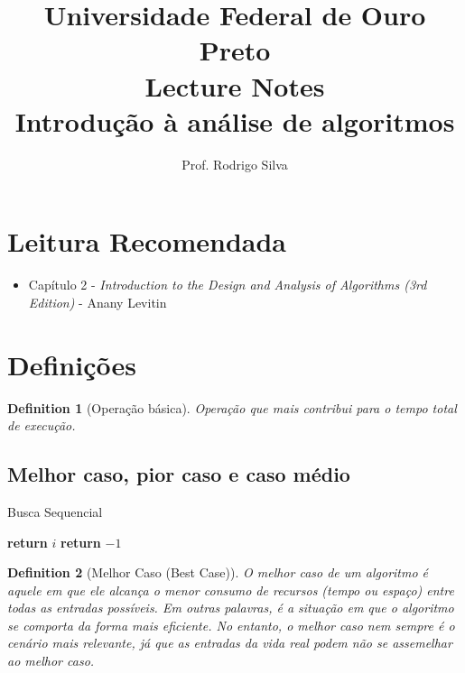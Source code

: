 \documentclass{article}
\title{\vspace{-2 cm}Universidade Federal de Ouro Preto \\ Lecture Notes \\ Introdução à análise de algoritmos}
\author{Prof. Rodrigo Silva}
\newtheorem{definition}{Definition}[section]
\begin{document}
\maketitle

\section*{Leitura Recomendada}

\begin{itemize}
    \item Capítulo 2 - \textit{Introduction to the Design and Analysis of Algorithms (3rd Edition)} - Anany Levitin 
\end{itemize}

\section{Definições}

\begin{definition}[Operação básica]
    Operação que mais contribui para o tempo total de execução.
\end{definition}

\subsection{Melhor caso, pior caso e caso médio}

\begin{algorithm}[!ht]
    \caption{Busca Sequencial}
    \begin{algorithmic}[1]
                \State \textbf{return} $i$ 
            \EndIf
        \EndFor
        \State \textbf{return} $-1$ 
    \EndFunction
    \end{algorithmic}
    \end{algorithm}    

\begin{definition}[Melhor Caso (Best Case)]
O melhor caso de um algoritmo é aquele em que ele alcança o menor consumo de recursos (tempo ou espaço) entre todas as entradas possíveis. Em outras palavras, é a situação em que o algoritmo se comporta da forma mais eficiente. No entanto, o melhor caso nem sempre é o cenário mais relevante, já que as entradas da vida real podem não se assemelhar ao melhor caso.
\end{definition}
\end{document}
